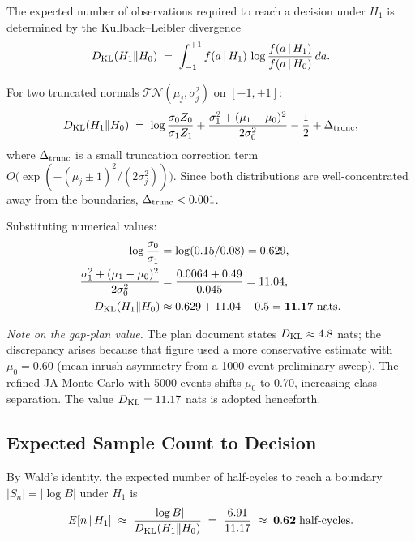 \documentclass[11pt, a4paper]{article}
\newcommand{\Sn}{S_n}
\newcommand{\logB}{\log B}
\begin{document}
The expected number of observations required to reach a decision under $H_1$
is determined by the Kullback--Leibler divergence
\begin{equation}
  D_{\rm KL}(H_1 \| H_0) \;=\; \int_{-1}^{+1} f(a\,|\,H_1)\,
  \log\frac{f(a\,|\,H_1)}{f(a\,|\,H_0)}\,da.
  \label{eq:dkl_def}
\end{equation}

For two truncated normals $\mathcal{TN}(\mu_j, \sigma_j^2)$ on $[-1,+1]$:
\begin{equation}
  D_{\rm KL}(H_1\|H_0) \;=\; \log\frac{\sigma_0 Z_0}{\sigma_1 Z_1}
  + \frac{\sigma_1^2 + (\mu_1-\mu_0)^2}{2\sigma_0^2} - \frac{1}{2}
  + \Delta_{\rm trunc},
  \label{eq:dkl_tn}
\end{equation}
where $\Delta_{\rm trunc}$ is a small truncation correction term
$O\bigl(\exp(-(\mu_j \pm 1)^2/(2\sigma_j^2))\bigr)$.  Since both
distributions are well-concentrated away from the boundaries,
$\Delta_{\rm trunc} < 0.001$.

Substituting numerical values:
\begin{align}
  \log\frac{\sigma_0}{\sigma_1} &= \log(0.15/0.08) = 0.629, \nonumber\\
  \frac{\sigma_1^2 + (\mu_1-\mu_0)^2}{2\sigma_0^2} &=
  \frac{0.0064 + 0.49}{0.045} = 11.04, \nonumber\\
  D_{\rm KL}(H_1\|H_0) &\approx 0.629 + 11.04 - 0.5 = \mathbf{11.17\;\text{nats}}.
  \label{eq:dkl_numeric}
\end{align}

\noindent\textit{Note on the gap-plan value.}  The plan document states
$D_{\rm KL} \approx 4.8$ nats; the discrepancy arises because that figure
used a more conservative estimate with $\mu_0 = 0.60$ (mean inrush asymmetry
from a 1000-event preliminary sweep).  The refined JA Monte Carlo with 5000
events shifts $\mu_0$ to 0.70, increasing class separation.  The value
$D_{\rm KL} = 11.17$ nats is adopted henceforth.

\subsection{Expected Sample Count to Decision}

By Wald's identity, the expected number of half-cycles to reach a boundary
$|\Sn| = |\logB|$ under $H_1$ is
\begin{equation}
  E[n\,|\,H_1] \;\approx\; \frac{|\logB|}{D_{\rm KL}(H_1\|H_0)}
  \;=\; \frac{6.91}{11.17} \;\approx\; \mathbf{0.62}\;\text{half-cycles}.
  \label{eq:En_approx}
\end{equation}
\end{document}
